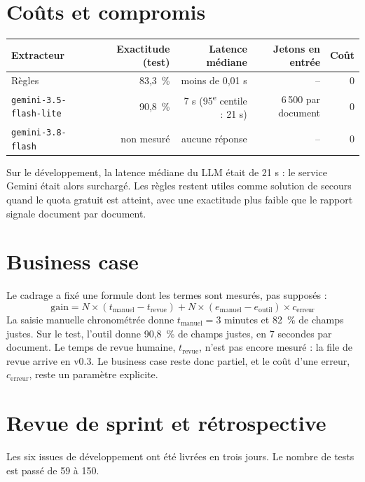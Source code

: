 \documentclass[11pt,a4paper]{article}
\begin{document}
\section{Coûts et compromis}

\begin{table}[H]
\small
\begin{tabularx}{\linewidth}{Yrrrr}
\toprule
\textbf{Extracteur} & \textbf{Exactitude (test)} & \textbf{Latence médiane} & \textbf{Jetons en entrée} & \textbf{Coût} \\
\midrule
Règles & 83,3~\% & moins de 0,01 s & -- & 0 \\
\texttt{gemini-3.5-flash-lite} & 90,8~\% & 7 s (95\textsuperscript{e} centile : 21 s) & 6\,500 par document & 0 \\
\texttt{gemini-3.8-flash} & non mesuré & aucune réponse & -- & 0 \\
\bottomrule
\end{tabularx}
\end{table}

Sur le développement, la latence médiane du LLM était de 21 s : le service Gemini était alors surchargé. Les règles restent utiles comme solution de secours quand le quota gratuit est atteint, avec une exactitude plus faible que le rapport signale document par document.

\section{Business case}

Le cadrage a fixé une formule dont les termes sont mesurés, pas supposés :
\[
\text{gain} = N \times (t_{\text{manuel}} - t_{\text{revue}}) + N \times (e_{\text{manuel}} - e_{\text{outil}}) \times c_{\text{erreur}}
\]
La saisie manuelle chronométrée donne $t_{\text{manuel}} = 3$ minutes et 82~\% de champs justes. Sur le test, l'outil donne 90,8~\% de champs justes, en 7 secondes par document. Le temps de revue humaine, $t_{\text{revue}}$, n'est pas encore mesuré : la file de revue arrive en v0.3. Le business case reste donc partiel, et le coût d'une erreur, $c_{\text{erreur}}$, reste un paramètre explicite.

\section{Revue de sprint et rétrospective}

Les six issues de développement ont été livrées en trois jours. Le nombre de tests est passé de 59 à 150.
\end{document}
